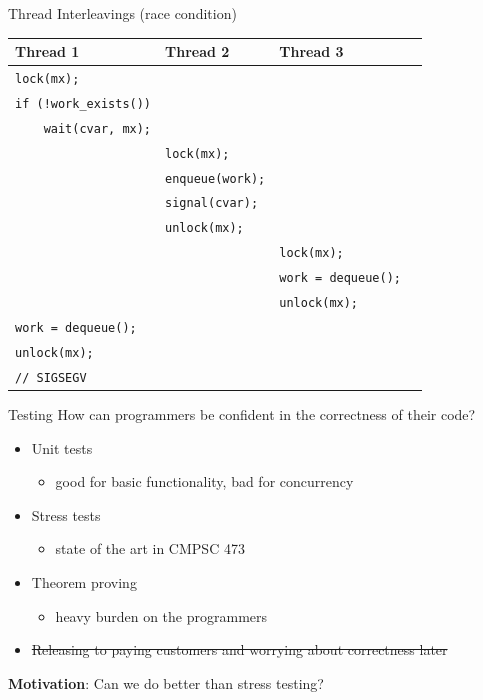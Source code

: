 \documentclass[xcolor=dvipsnames]{beamer}
\newcommand\classname{CMPSC 473\xspace}
\begin{document}
\begin{frame}{Thread Interleavings (race condition)}
	\begin{center}
		\begin{tabular}{|l|l|l|}
			\hline
			\cellcolor{thread1} {\bf Thread 1} & \cellcolor{thread2} {\bf Thread 2} & \cellcolor{thread3} {\bf Thread 3} \\
			\hline
			\small \texttt{lock(mx);} & & \\
			\small \texttt{if~(!work\_exists())} & & \\
			\small \texttt{~~~~wait(cvar,~mx);} & & \\
			
			& \small \texttt{lock(mx);} & \\
			& \small \texttt{enqueue(work);} & \\
			& \small \texttt{signal(cvar);} & \\
			& \small \texttt{unlock(mx);} & \\
			
			& & \small \texttt{lock(mx);} \\
			& & \small \texttt{work~=~dequeue();~~} \\
			& & \small \texttt{unlock(mx);} \\

			\small \texttt{work~=~dequeue();} & & \\
			\small \texttt{unlock(mx);} & & \\
			\small \texttt{//~SIGSEGV} {\large \frownie}& & \\
			\hline
		\end{tabular}
	\end{center}
\end{frame}


\begin{frame}{Testing}
	How can programmers be confident in the correctness of their code?
	\begin{itemize}
		\item Unit tests
		\begin{itemize}
			\item good for basic functionality, bad for concurrency
		\end{itemize}
		\item Stress tests
		\begin{itemize}
			\item state of the art in \classname
		\end{itemize}
		\item Theorem proving
		\begin{itemize}
			\item heavy burden on the programmers
		\end{itemize}
		\item \sout{Releasing to paying customers and worrying about correctness later}
	\end{itemize}
	\linegap

	{\bf Motivation}: Can we do better than stress testing?
\end{frame}
\end{document}
